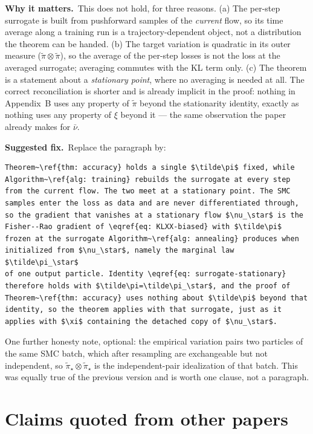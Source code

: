 \documentclass[11pt]{article}
\newcommand{\why}[1]{\smallskip\noindent\textbf{Why it matters.}\ #1\par}
\newcommand{\fix}[1]{\smallskip\noindent\textbf{Suggested fix.}\ #1\par}
\begin{document}
\why{This does not hold, for three reasons. (a) The per-step surrogate is built
from pushforward samples of the \emph{current} flow, so its time average along
a training run is a trajectory-dependent object, not a distribution the theorem
can be handed. (b) The target variation is quadratic in its outer measure
($\tilde\pi\otimes\tilde\pi$), so the average of the per-step losses is not the
loss at the averaged surrogate; averaging commutes with the KL term only.
(c) The theorem is a statement about a \emph{stationary point}, where no
averaging is needed at all. The correct reconciliation is shorter and is
already implicit in the proof: nothing in Appendix~B uses any property of
$\tilde\pi$ beyond the stationarity identity, exactly as nothing uses any
property of $\xi$ beyond it --- the same observation the paper already makes
for $\bar\nu$.}

\fix{Replace the paragraph by:}

\begin{verbatim}
Theorem~\ref{thm: accuracy} holds a single $\tilde\pi$ fixed, while
Algorithm~\ref{alg: training} rebuilds the surrogate at every step
from the current flow. The two meet at a stationary point. The SMC
samples enter the loss as data and are never differentiated through,
so the gradient that vanishes at a stationary flow $\nu_\star$ is the
Fisher--Rao gradient of \eqref{eq: KLXX-biased} with $\tilde\pi$
frozen at the surrogate Algorithm~\ref{alg: annealing} produces when
initialized from $\nu_\star$, namely the marginal law $\tilde\pi_\star$
of one output particle. Identity \eqref{eq: surrogate-stationary}
therefore holds with $\tilde\pi=\tilde\pi_\star$, and the proof of
Theorem~\ref{thm: accuracy} uses nothing about $\tilde\pi$ beyond that
identity, so the theorem applies with that surrogate, just as it
applies with $\xi$ containing the detached copy of $\nu_\star$.
\end{verbatim}

\noindent
One further honesty note, optional: the empirical variation pairs two particles
of the same SMC batch, which after resampling are exchangeable but not
independent, so $\tilde\pi_\star\otimes\tilde\pi_\star$ is the independent-pair
idealization of that batch. This was equally true of the previous version and
is worth one clause, not a paragraph.

\section{Claims quoted from other papers}
\label{sec:cites}
\end{document}
